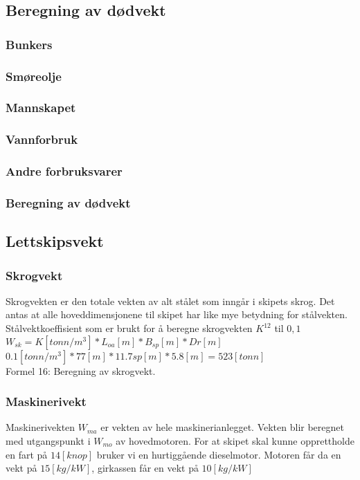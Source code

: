 \documentclass[norsk]{article}
\begin{document}
 	\subsection{Beregning av dødvekt}
  		\subsubsection{Bunkers}
  		\subsubsection{Smøreolje}
  		\subsubsection{Mannskapet}
  		\subsubsection{Vannforbruk}
  		\subsubsection{Andre forbruksvarer}
  		\subsubsection{Beregning av dødvekt}
  	\subsection{Lettskipsvekt}
  		\subsubsection{Skrogvekt}
  		Skrogvekten er den totale vekten av alt stålet som inngår i skipets skrog. Det antas at alle hoveddimensjonene til skipet har like mye betydning for 	stålvekten. Stålvektkoeffisient som er brukt for å beregne skrogvekten $K^{12}$ til $0,1$\\
		
$W_{sk} = K[tonn/m^3] * L_{oa}[m] * B_{sp}[m] * Dr[m]$\\

$0.1 [tonn/m^3] * 77[m] * 11.7{sp}[m] * 5.8[m] = 523[tonn]$\\

\footnotesize
Formel 16: Beregning av skrogvekt.
 
  		
  		\subsubsection{Maskinerivekt}
  		Maskinerivekten $W_{ma}$ er vekten av hele maskinerianlegget. Vekten blir beregnet med utgangspunkt i $W_{mo}$ av hovedmotoren. For at skipet skal kunne opprettholde en fart på $14[knop]$ bruker vi en hurtiggående dieselmotor. Motoren får da en vekt på $15[kg/kW]$, girkassen får en vekt på $10[kg/kW]$ 
\end{document}
